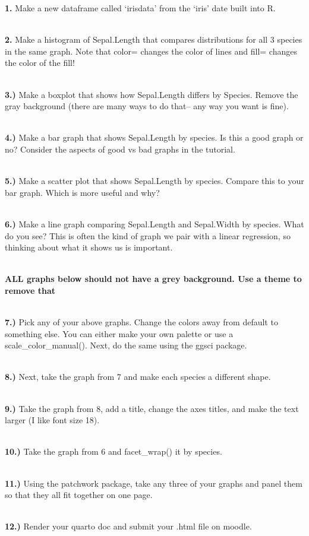 \documentclass[
  letterpaper,
  DIV=11,
  numbers=noendperiod]{scrartcl}
\begin{document}
\textbf{1.} Make a new dataframe called `irisdata' from the `iris' date
built into R.\\
\strut \\
\textbf{2.} Make a histogram of Sepal.Length that compares distributions
for all 3 species in the same graph. Note that color= changes the color
of lines and fill= changes the color of the fill!\\
\strut \\
\textbf{3.)} Make a boxplot that shows how Sepal.Length differs by
Species. Remove the gray background (there are many ways to do that--
any way you want is fine).\\
\strut \\
\textbf{4.)} Make a bar graph that shows Sepal.Length by species. Is
this a good graph or no? Consider the aspects of good vs bad graphs in
the tutorial.\\
\strut \\
\textbf{5.)} Make a scatter plot that shows Sepal.Length by species.
Compare this to your bar graph. Which is more useful and why?\\
\strut \\
\textbf{6.)} Make a line graph comparing Sepal.Length and Sepal.Width by
species. What do you see? This is often the kind of graph we pair with a
linear regression, so thinking about what it shows us is important.\\
\strut \\
\textbf{ALL graphs below should not have a grey background. Use a theme
to remove that}\\
\strut \\
\textbf{7.)} Pick any of your above graphs. Change the colors away from
default to something else. You can either make your own palette or use a
scale\_color\_manual(). Next, do the same using the ggsci package.\\
\strut \\
\textbf{8.)} Next, take the graph from 7 and make each species a
different shape.\\
\strut \\
\textbf{9.)} Take the graph from 8, add a title, change the axes titles,
and make the text larger (I like font size 18).\\
\strut \\
\textbf{10.)} Take the graph from 6 and facet\_wrap() it by species.\\
\strut \\
\textbf{11.)} Using the patchwork package, take any three of your graphs
and panel them so that they all fit together on one page.\\
\strut \\
\textbf{12.)} Render your quarto doc and submit your .html file on
moodle.
\end{document}

